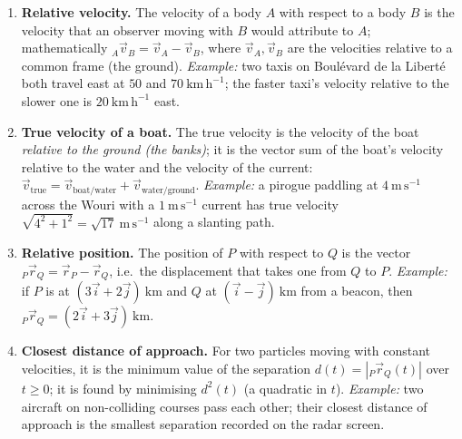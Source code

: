 \documentclass[11pt]{article}
\begin{document}
\begin{corrige}
\begin{enumerate}
\item \textbf{Relative velocity.} The velocity of a body $A$ with respect to a body $B$ is the velocity that an observer moving with $B$ would attribute to $A$; mathematically ${}_A\vec{v}_B = \vec{v}_A - \vec{v}_B$, where $\vec{v}_A, \vec{v}_B$ are the velocities relative to a common frame (the ground). \emph{Example:} two taxis on Boul\'evard de la Libert\'e both travel east at $50$ and $70\ \mathrm{km\,h^{-1}}$; the faster taxi's velocity relative to the slower one is $20\ \mathrm{km\,h^{-1}}$ east.
\item \textbf{True velocity of a boat.} The true velocity is the velocity of the boat \emph{relative to the ground (the banks)}; it is the vector sum of the boat's velocity relative to the water and the velocity of the current: $\vec{v}_{\text{true}} = \vec{v}_{\text{boat/water}} + \vec{v}_{\text{water/ground}}$. \emph{Example:} a pirogue paddling at $4\ \mathrm{m\,s^{-1}}$ across the Wouri with a $1\ \mathrm{m\,s^{-1}}$ current has true velocity $\sqrt{4^2+1^2} = \sqrt{17}\ \mathrm{m\,s^{-1}}$ along a slanting path.
\item \textbf{Relative position.} The position of $P$ with respect to $Q$ is the vector ${}_P\vec{r}_Q = \vec{r}_P - \vec{r}_Q$, i.e.\ the displacement that takes one from $Q$ to $P$. \emph{Example:} if $P$ is at $(3\vec{i} + 2\vec{j})\ \mathrm{km}$ and $Q$ at $(\vec{i} - \vec{j})\ \mathrm{km}$ from a beacon, then ${}_P\vec{r}_Q = (2\vec{i} + 3\vec{j})\ \mathrm{km}$.
\item \textbf{Closest distance of approach.} For two particles moving with constant velocities, it is the minimum value of the separation $d(t) = |{}_P\vec{r}_Q(t)|$ over $t \geq 0$; it is found by minimising $d^2(t)$ (a quadratic in $t$). \emph{Example:} two aircraft on non-colliding courses pass each other; their closest distance of approach is the smallest separation recorded on the radar screen.
\end{enumerate}
\end{corrige}
\end{document}
